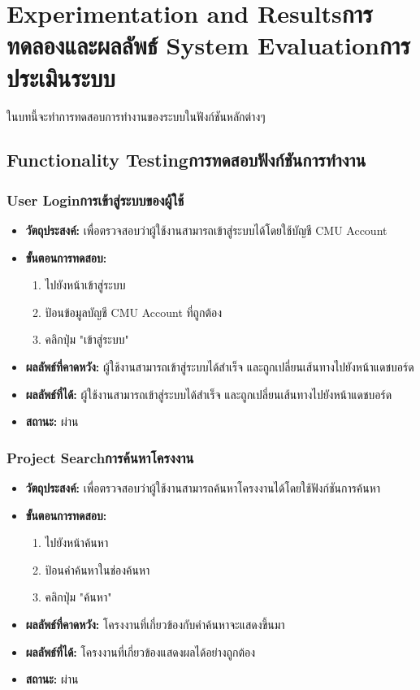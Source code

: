 \chapter{\ifproject%
\ifenglish Experimentation and Results\else การทดลองและผลลัพธ์\fi
\else%
\ifenglish System Evaluation\else การประเมินระบบ\fi
\fi
}

ในบทนี้จะทำการทดสอบการทำงานของระบบในฟังก์ชันหลักต่างๆ

\section{\ifenglish Functionality Testing\else การทดสอบฟังก์ชันการทำงาน\fi}

\subsection{\ifenglish User Login\else การเข้าสู่ระบบของผู้ใช้\fi}
\begin{itemize}
  \item \textbf{วัตถุประสงค์:} เพื่อตรวจสอบว่าผู้ใช้งานสามารถเข้าสู่ระบบได้โดยใช้บัญชี CMU Account
  \item \textbf{ขั้นตอนการทดสอบ:}
  \begin{enumerate}
    \item ไปยังหน้าเข้าสู่ระบบ
    \item ป้อนข้อมูลบัญชี CMU Account ที่ถูกต้อง
    \item คลิกปุ่ม "เข้าสู่ระบบ"
  \end{enumerate}
  \item \textbf{ผลลัพธ์ที่คาดหวัง:} ผู้ใช้งานสามารถเข้าสู่ระบบได้สำเร็จ และถูกเปลี่ยนเส้นทางไปยังหน้าแดชบอร์ด
  \item \textbf{ผลลัพธ์ที่ได้:} ผู้ใช้งานสามารถเข้าสู่ระบบได้สำเร็จ และถูกเปลี่ยนเส้นทางไปยังหน้าแดชบอร์ด
  \item \textbf{สถานะ:} ผ่าน
\end{itemize}

\subsection{\ifenglish Project Search\else การค้นหาโครงงาน\fi}
\begin{itemize}
  \item \textbf{วัตถุประสงค์:} เพื่อตรวจสอบว่าผู้ใช้งานสามารถค้นหาโครงงานได้โดยใช้ฟังก์ชันการค้นหา
  \item \textbf{ขั้นตอนการทดสอบ:}
  \begin{enumerate}
    \item ไปยังหน้าค้นหา
    \item ป้อนคำค้นหาในช่องค้นหา
    \item คลิกปุ่ม "ค้นหา"
  \end{enumerate}
  \item \textbf{ผลลัพธ์ที่คาดหวัง:} โครงงานที่เกี่ยวข้องกับคำค้นหาจะแสดงขึ้นมา
  \item \textbf{ผลลัพธ์ที่ได้:} โครงงานที่เกี่ยวข้องแสดงผลได้อย่างถูกต้อง
  \item \textbf{สถานะ:} ผ่าน
\end{itemize}

